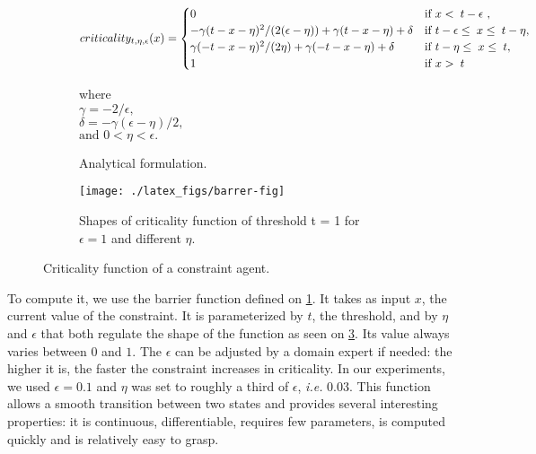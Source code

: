 \begin{figure}
	\centering
	\begin{subfigure}[b]{\textwidth}
	\centering
	\scriptsize
	
		\[criticality_{t,\eta,\epsilon}(x)=
			\begin{cases}
				0		&\text{if \( x < \; t - \epsilon \) },\\
				-\gamma ( t - x - \eta ) ^ 2 / ( 2 ( \epsilon - \eta)) + \gamma ( t - x - \eta ) + \delta &\text{if \(t - \epsilon \leq \;x \leq \;t - \eta \)},\\
				\gamma (-t-x-\eta)^2/(2 \eta)+\gamma (-t-x-\eta) + \delta &\text{if \(t - \eta \leq \;x \leq \;t\)},\\
				1	&\text{if \( x > \; t \)}
			\end{cases}\]

		where\\
		$\gamma = -2/ \epsilon,$\\
		$\delta = -\gamma (\epsilon - \eta )/2,$\\
		$\text{and } 0 < \eta < \epsilon.$
	\caption{Analytical formulation.}\label{crit_func}
	\end{subfigure}
	
	\begin{subfigure}[b]{\textwidth}
		\centering
		\texttt{[image: ./latex\_figs/barrer-fig]}
		\caption{Shapes of criticality function of threshold t = 1 for $\epsilon = 1$ and different $\eta$.}\label{crit_shapes}
	\end{subfigure}
	
\caption{Criticality function of a constraint agent.}
\end{figure}

To compute it, we use the barrier function defined on \figurename{} \ref{crit_func}. It takes as input \(x\), the current value of the constraint. It is parameterized by \(t\), the threshold, and by \(\eta\) and \(\epsilon\) that both regulate the shape of the function as seen on \figurename{} \ref{crit_shapes}. Its value always varies between \(0\) and \(1\).
The \(\epsilon\) can be adjusted by a domain expert if needed: the higher it is, the faster the constraint increases in criticality.
In our experiments, we used $\epsilon = 0.1$ and $\eta$ was set to roughly a third of $\epsilon$, \textit{i.e.} 0.03.
This function allows a smooth transition between two states and provides several interesting properties: it is continuous, differentiable, requires few parameters, is computed quickly and is relatively easy to grasp.

